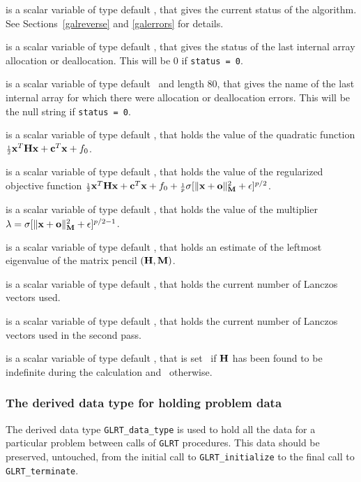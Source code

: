 \documentclass{galahad}
\newcommand{\packagename}{GL\-RT}
\begin{document}
\begin{description}
 is a scalar variable of type default \integer, that gives the
current status of the algorithm. See Sections~\ref{galreverse} and
\ref{galerrors} for details.

 is a scalar variable of type default \integer,
that gives the status of the last internal array allocation
or deallocation. This will be 0 if {\tt status = 0}.

 is a scalar variable of type default \character\
and length 80, that  gives the name of the last internal array
for which there were allocation or deallocation errors.
This will be the null string if {\tt status = 0}.

 is a scalar variable of type default \realdp, that holds the
value of the quadratic function ${\scriptstyle \frac{1}{2}} {\mathbf{x}}^T {\mathbf{H}} {\mathbf{x}} + {\mathbf{c}}^T {\mathbf{x}} + f_0$.

 is a scalar variable of type default \realdp, that
holds the value of the regularized objective function ${\scriptstyle \frac{1}{2}} {\mathbf{x}}^T {\mathbf{H}} {\mathbf{x}}
 + {\mathbf{c}}^T {\mathbf{x}} + f_0 +
  {\scriptstyle \frac{1}{p}} \sigma [ \| {\mathbf{x}} + {\mathbf{o}} \|_{{\mathbf{M}}}^2 + \epsilon ]^{p/2}$.

 is a scalar variable of type default
\realdp, that holds the value of the multiplier $\lambda =
\sigma [ \|{\mathbf{x}}+{\mathbf{o}}\|_{{\mathbf{M}}}^2 + \epsilon]^{p/2-1}$.

 is a scalar variable of type default
\realdp, that holds an estimate of the leftmost eigenvalue of the
matrix pencil $({\mathbf{H}},{\mathbf{M}})$.

 is a scalar variable of type default \integer, that holds the
current number of Lanczos vectors used.

 is a scalar variable of type default \integer, that holds the
current number of Lanczos vectors used in the second pass.

 is a scalar variable of type default \logical, that
is set \true\ if ${\mathbf{H}}$ has been found to be indefinite during the calculation
and \false\ otherwise.
\end{description}


\subsubsection{The derived data type for holding problem data}\label{typedata}
The derived data type
{\tt \packagename\_data\_type}
is used to hold all the data for a particular problem between calls of
{\tt \packagename} procedures.
This data should be preserved, untouched, from the initial call to
{\tt \packagename\_initialize}
to the final call to
{\tt \packagename\_terminate}.
\end{document}
